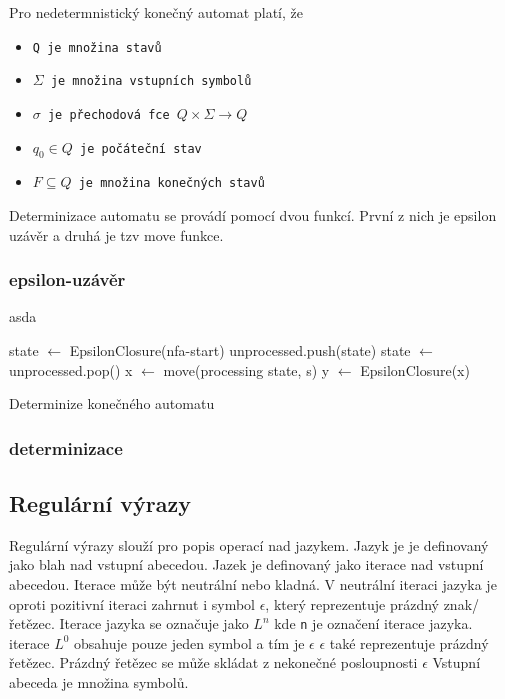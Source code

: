Pro nedetermnistický konečný automat platí, že

\begin{itemize}
\item{\tt{Q} je množina stavů}
\item{\tt{$\Sigma$} je množina vstupních symbolů}
\item{\tt{$\sigma$} je přechodová fce $Q \times \Sigma \rightarrow Q$}
\item{\tt{$q_0 \in Q$} je počáteční stav}
\item{\tt{$F \subseteq Q$} je množina konečných stavů}
\end{itemize}
Determinizace automatu se provádí pomocí dvou funkcí.
První z nich je epsilon uzávěr a druhá je tzv move funkce.

\subsubsection{epsilon-uzávěr} %
asda

\begin{algorithm}[H]
	state $\leftarrow$ EpsilonClosure(nfa-start)\;
	unprocessed.push(state)\;
	{
		state $\leftarrow$ unprocessed.pop()\;
		{
			x $\leftarrow$  move(processing state, s)\;
			y $\leftarrow$  EpsilonClosure(x)\;
		}
	}
	\caption{Determinize konečného automatu}
\end{algorithm}

\subsubsection{determinizace} %

\subsection{Regulární výrazy}

Regulární výrazy slouží pro popis operací nad jazykem.
Jazyk je je definovaný jako blah nad vstupní abecedou.
Jazek je definovaný jako iterace nad vstupní abecedou.
Iterace může  být neutrální nebo kladná.
V neutrální iteraci jazyka je oproti pozitivní iteraci zahrnut i symbol $\epsilon$,
který reprezentuje prázdný znak/řetězec.
Iterace jazyka se označuje jako $L^n$ kde \texttt{n} je označení iterace jazyka.
iterace $L^0$ obsahuje pouze jeden symbol a tím je $\epsilon$
$\epsilon$ také reprezentuje prázdný řetězec. Prázdný řetězec se může skládat z nekonečné posloupnosti $\epsilon$
Vstupní abeceda je množina symbolů.

